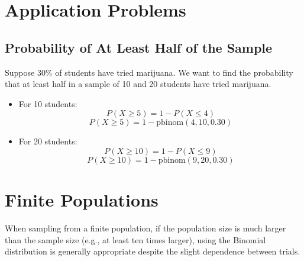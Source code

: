 \documentclass{article}
\begin{document}
\section{Application Problems}
\subsection{Probability of At Least Half of the Sample}
Suppose 30\% of students have tried marijuana. We want to find the probability that at least half in a sample of 10 and 20 students have tried marijuana.

\begin{itemize}
    \item For 10 students:
    \[
    P(X \geq 5) = 1 - P(X \leq 4)
    \]
    \[
    P(X \geq 5) = 1 - \text{pbinom}(4, 10, 0.30)
    \]
    
    \item For 20 students:
    \[
    P(X \geq 10) = 1 - P(X \leq 9)
    \]
    \[
    P(X \geq 10) = 1 - \text{pbinom}(9, 20, 0.30)
    \]
\end{itemize}

\section{Finite Populations}
When sampling from a finite population, if the population size is much larger than the sample size (e.g., at least ten times larger), using the Binomial distribution is generally appropriate despite the slight dependence between trials.
\end{document}

